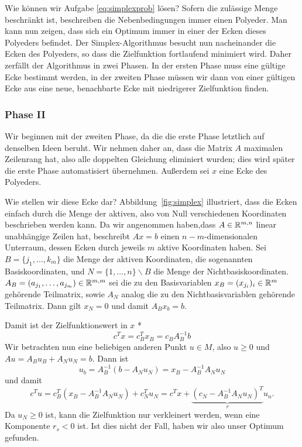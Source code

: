 Wie können wir Aufgabe \eqref{eq:simplexprob} lösen? Sofern die
zulässige Menge beschränkt ist, beschreiben die Nebenbedingungen immer
einen Polyeder. Man kann nun zeigen, dass sich ein Optimum immer in
einer der Ecken dieses Polyeders befindet. Der Simplex-Algorithmus
besucht nun nacheinander die Ecken des Polyeders, so dass die
Zielfunktion fortlaufend minimiert wird. Daher zerfällt der
Algorithmus in zwei Phasen. In der ersten Phase muss eine gültige Ecke
bestimmt werden, in der zweiten Phase müssen wir dann von einer
gültigen Ecke aus eine neue, benachbarte Ecke mit niedrigerer
Zielfunktion finden.

\subsubsection*{Phase II}

Wir beginnen mit der zweiten Phase, da die die erste Phase letztlich
auf denselben Ideen beruht. Wir nehmen daher an, dass die Matrix $A$
maximalen Zeilenrang hat, also alle doppelten Gleichung eliminiert
wurden; dies wird später die erste Phase automatisiert übernehmen.
Außerdem sei $x$ eine Ecke des Polyeders.

Wie stellen wir diese Ecke dar? Abbildung~\ref{fig:simplex}
illustriert, dass die Ecken einfach durch die Menge der aktiven, also
von Null verschiedenen Koordinaten beschrieben werden kann. Da wir
angenommen haben,dass $A\in\mathbb{R}^{m,n}$ linear unabhängige Zeilen hat,
beschreibt $Ax=b$ einen $n-m$-dimensionalen Unterraum, dessen Ecken
durch jeweils $m$ aktive Koordinaten haben. Sei $B=\{j_1,\ldots,k_m\}$
die Menge der aktiven Koordinaten, die sogenannten Basiskoordinaten,
und $N=\{1,\ldots,n\}\backslash B$ die Menge der
Nichtbasiskoordinaten. $A_B = (a_{j_1},\ldots,a_{j_m})\in\mathbb{R}^{m,m}$
sei die zu den Basisvariablen $x_B = (x_{j_i})_i\in\mathbb{R}^m$ gehörende
Teilmatrix, sowie $A_N$ analog die zu den Nichtbasisvariablen
gehörende Teilmatrix. Dann gilt $x_N=0$ und damit $A_Bx_b = b$.

Damit ist der Zielfunktionswert in $x$
*\begin{equation}
  c^Tx = c_B^Tx_B = c_BA_B^{-1}b
\end{equation}
Wir betrachten nun eine beliebigen anderen Punkt $u\in M$, also $u\ge
0$ und $Au=A_Bu_B + A_Nu_N = b$. Dann ist
\begin{equation}
  \label{eq:simplexub}
  u_b = A_B^{-1}(b-A_Nu_N) = x_B - A_B^{-1}A_Nu_N
\end{equation}
und damit
\begin{equation}
  c^Tu = c_B^T(x_B - A_B^{-1}A_Nu_N) + c_N^Tu_N = c^Tx +
  \underbrace{(c_N - A_B^{-1}A_Nu_N)^T}_{r}u_n.
\end{equation}
Da $u_N\ge 0$ ist, kann die Zielfunktion nur verkleinert werden, wenn
eine Komponente $r_s < 0$ ist. Ist dies nicht der Fall, haben wir also
unser Optimum gefunden.

